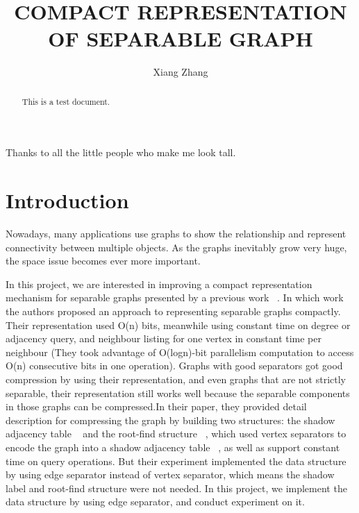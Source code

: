 \documentclass[12pt,glossary]{dalthesis}
\begin{document}
\macs  %
\title{COMPACT REPRESENTATION OF SEPARABLE GRAPH}
\author{Xiang Zhang}



\nolistoftables
\nolistoffigures

\frontmatter

\begin{abstract}
This is a test document.
\end{abstract}

\printglossary

\begin{acknowledgements}
Thanks to all the little people who make me look tall.
\end{acknowledgements}

\mainmatter

\chapter{Introduction}

Nowadays, many applications use graphs to show the relationship and represent connectivity between multiple objects. As the graphs inevitably grow very huge, the space issue becomes ever more important.

In this project, we are interested in improving a compact representation mechanism for separable graphs presented by a previous work ~\cite{compact-representation}. In which work the authors proposed an approach to representing separable graphs compactly. Their representation used O(n) bits, meanwhile using constant time on degree or adjacency query, and neighbour listing for one vertex in constant time per neighbour (They took advantage of O(logn)-bit parallelism computation to access O(n) consecutive bits in one operation). Graphs with good separators got good compression by using their representation, and even graphs that are not strictly separable, their representation still works well because the separable components in those graphs can be compressed.In their paper, they provided detail description for compressing the graph by building two structures: the shadow adjacency table ~\cite{compact-representation} and the root-find structure ~\cite{compact-representation}, which used vertex separators to encode the graph into a shadow adjacency table ~\cite{compact-representation}, as well as support constant time on query operations. But their experiment implemented the data structure by using edge separator instead of vertex separator, which means the shadow label
and root-find structure were not needed. In this project, we implement the data structure by using edge separator, and conduct experiment on it.
\end{document}

